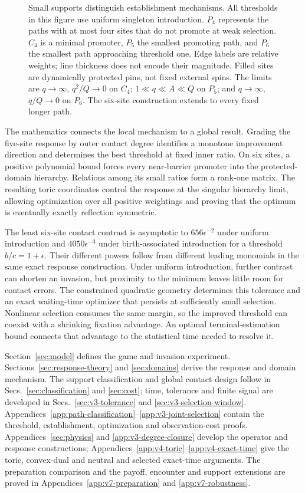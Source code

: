 \documentclass[aps,pre,reprint,amsmath,amssymb,longbibliography]{revtex4-2}
\begin{document}
\begin{figure}[t]
\caption{Small supports distinguish establishment mechanisms.
All thresholds in this figure use uniform singleton introduction.
$P_4$ represents the paths with at most four sites that do not promote
at weak selection. $C_4$ is a minimal promoter, $P_5$ the smallest
promoting path, and $P_6$ the smallest path approaching threshold one.
Edge labels are relative weights; line thickness does not encode their
magnitude. Filled sites are dynamically protected pins, not fixed
external spins. The limits are $q\to\infty$, $q^2/Q\to0$ on $C_4$;
$1\ll q\ll A\ll Q$ on $P_5$; and $q\to\infty$, $q/Q\to0$ on
$P_6$. The six-site construction extends to every fixed longer path.}
\label{fig:paths}
\end{figure}

The mathematics connects the local mechanism to a global result.
Grading the five-site response by outer contact degree identifies a
monotone improvement direction and determines the best threshold at
fixed inner ratio. On six sites, a positive polynomial bound forces
every near-barrier promoter into the protected-domain hierarchy.
Relations among its small ratios form a rank-one matrix. The resulting
toric coordinates control the response at the singular hierarchy limit,
allowing optimization over all positive weightings and proving that
the optimum is eventually exactly reflection symmetric.

The least six-site contact contrast is asymptotic to $656\epsilon^{-2}$ under uniform
introduction and $4050\epsilon^{-3}$ under birth-associated introduction
for a threshold $b/c=1+\epsilon$. Their different powers follow from
different leading monomials in the same exact response construction.
Under uniform introduction, further contrast can shorten an invasion,
but proximity to the minimum leaves little room for contact errors.
The constrained quadratic geometry determines this tolerance and an
exact waiting-time optimizer that persists at sufficiently small
selection. Nonlinear selection consumes the same margin, so the
improved threshold can coexist with a shrinking fixation advantage.
An optimal terminal-estimation bound connects that advantage to the
statistical time needed to resolve it.

Section~\ref{sec:model} defines the game and invasion experiment.
Sections~\ref{sec:response-theory} and \ref{sec:domains} derive the
response and domain mechanism. The support classification and global
contact design follow in Secs.~\ref{sec:classification} and
\ref{sec:cost}; time, tolerance and finite signal are developed in
Secs.~\ref{sec:v3-tolerance} and \ref{sec:v3-selection-window}.
Appendices~\ref{app:path-classification}--\ref{app:v3-joint-selection}
contain the threshold, establishment, optimization and observation-cost
proofs. Appendices~\ref{sec:physics} and \ref{app:v3-degree-closure}
develop the operator and response constructions;
Appendices~\ref{app:v4-toric}--\ref{app:v4-exact-time} give the toric,
convex-dual and neutral and selected exact-time arguments.
The preparation comparison and the payoff, encounter and support
extensions are proved in Appendices~\ref{app:v7-preparation} and
\ref{app:v7-robustness}.
\end{document}
